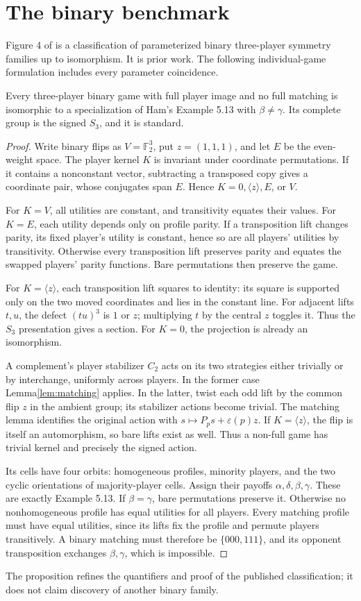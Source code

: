 \section{The binary benchmark}\label{sec:03-binary}
Figure 4 of \citet{ham2021} is a classification of parameterized binary
three-player symmetry families up to isomorphism. It is prior work. The
following individual-game formulation includes every parameter coincidence.

\begin{proposition}\label{prop:binary}
Every three-player binary game with full player image and no full matching is
isomorphic to a specialization of Ham's Example 5.13 with $\beta\ne\gamma$.
Its complete group is the signed $S_3$, and it is standard.
\end{proposition}
\begin{proof}
Write binary flips as $V=\mathbb F_2^3$, put $z=(1,1,1)$, and let $E$ be the
even-weight space. The player kernel $K$ is invariant under coordinate
permutations. If it contains a nonconstant vector, subtracting a transposed
copy gives a coordinate pair, whose conjugates span $E$. Hence
$K=0,\langle z\rangle,E$, or $V$.

For $K=V$, all utilities are constant, and transitivity equates their values.
For $K=E$, each utility depends only on profile parity. If a transposition lift
changes parity, its fixed player's utility is constant, hence so are all
players' utilities by transitivity. Otherwise every transposition lift
preserves parity and equates the swapped players' parity functions. Bare
permutations then preserve the game.

For $K=\langle z\rangle$, each transposition lift squares to identity: its
square is supported only on the two moved coordinates and lies in the
constant line. For adjacent lifts $t,u$, the defect $(tu)^3$ is $1$ or $z$;
multiplying $t$ by the central $z$ toggles it. Thus the $S_3$ presentation gives
a section. For $K=0$, the projection is already an isomorphism.

A complement's player stabilizer $C_2$ acts on its two strategies either
trivially or by interchange, uniformly across players. In the former case
Lemma\ref{lem:matching} applies. In the latter, twist each odd lift by the
common flip $z$ in the ambient group; its stabilizer actions become trivial.
The matching lemma identifies the original action with
$s\mapsto P_p s+\varepsilon(p)z$. If $K=\langle z\rangle$, the flip is itself
an automorphism, so bare lifts exist as well. Thus a non-full game has
trivial kernel and precisely the signed action.

Its cells have four orbits: homogeneous profiles, minority players, and the
two cyclic orientations of majority-player cells. Assign their payoffs
$\alpha,\delta,\beta,\gamma$. These are exactly Example 5.13. If $\beta=\gamma$,
bare permutations preserve it. Otherwise no nonhomogeneous profile has equal
utilities for all players. Every matching profile must have equal utilities,
since its lifts fix the profile and permute players transitively. A binary
matching must therefore be $\{000,111\}$, and its opponent transposition
exchanges $\beta,\gamma$, which is impossible.
\end{proof}
The proposition refines the quantifiers and proof of the published
classification; it does not claim discovery of another binary family.
